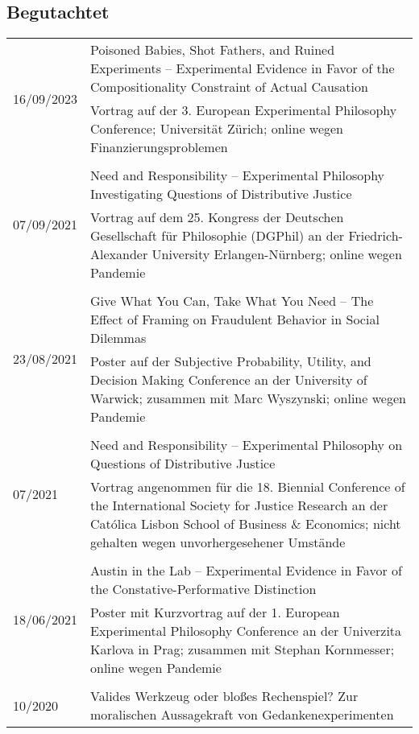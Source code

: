 \documentclass[a4paper,10pt]{article}
\begin{document}
\subsection*{Begutachtet}
\begin{longtable}{p{2cm}p{}}
\multirow{2}{2cm}{\footnotesize{16/09/2023}} & Poisoned Babies, Shot Fathers, and Ruined Experiments -- Experimental Evidence in Favor of the Compositionality Constraint of Actual Causation\\
& \footnotesize{Vortrag auf der 3. European Experimental Philosophy Conference; Universität Zürich; online wegen Finanzierungsproblemen}\\
\\
\multirow{2}{2cm}{\footnotesize{07/09/2021}} & Need and Responsibility -- Experimental Philosophy Investigating Questions of Distributive Justice\\
& \footnotesize{Vortrag auf dem 25. Kongress der Deutschen Gesellschaft für Philosophie (DGPhil) an der Friedrich-Alexander University Erlangen-Nürnberg; online wegen Pandemie}\\
\\
\multirow{2}{2cm}{\footnotesize{23/08/2021}} & Give What You Can, Take What You Need -- The Effect of Framing on Fraudulent Behavior in Social Dilemmas\\
& \footnotesize{Poster auf der Subjective Probability, Utility, and Decision Making Conference an der University of Warwick; zusammen mit Marc Wyszynski; online wegen Pandemie}\\
\\
\multirow{2}{2cm}{\footnotesize{07/2021}} & Need and Responsibility -- Experimental Philosophy on Questions of Distributive Justice\\
& \footnotesize{Vortrag angenommen für die 18. Biennial Conference of the International Society for Justice Research an der Católica Lisbon School of Business \& Economics; nicht gehalten wegen unvorhergesehener Umstände}\\
\\
\multirow{2}{2cm}{\footnotesize{18/06/2021}} & Austin in the Lab -- Experimental Evidence in Favor of the Constative-Performative Distinction\\
& \footnotesize{Poster mit Kurzvortrag auf der 1. European Experimental Philosophy Conference an der Univerzita Karlova in Prag; zusammen mit Stephan Kornmesser; online wegen Pandemie}\\
\\
\multirow{2}{2cm}{\footnotesize{10/2020}} & Valides Werkzeug oder bloßes Rechenspiel? Zur moralischen Aussagekraft von Gedankenexperimenten\\

\end{longtable}
\end{document}
